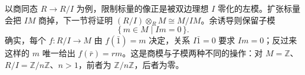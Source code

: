 以商同态 \(R\to R/I\) 为例，限制标量的像正是被双边理想 \(I\) 零化的左模。扩张标量会把 \(IM\) 商掉，下一节将证明 \((R/I)\otimes_RM\cong M/IM\)。余诱导则保留子模
\[
	\{\,m\in M\mid Im=0\,\}.
\]
确实，每个 \(f:R/I\to M\) 由 \(f(\bar1)=m\) 决定，关系 \(I\bar1=0\) 要求 \(Im=0\)；反过来这样的 \(m\) 唯一给出 \(f(\bar r)=rm\)。这是商模与子模两种不同的操作：对 \(M=\mathbb Z\)、\(R/I=\mathbb Z/n\mathbb Z\)、\(n>1\)，前者为 \(\mathbb Z/n\mathbb Z\)，后者为零。
